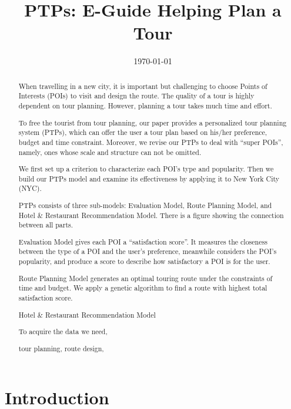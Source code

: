 \documentclass{mcmthesis}
\begin{document}
\linespread{0.6}
\setlength{\parskip}{0.5\baselineskip}
\title{PTPs: E-Guide Helping Plan a Tour}%

\date{\today}
\begin{abstract}
    When travelling in a new city, it is important but challenging to choose Points of Interests (POIs) to visit and design the route. The quality of a tour is highly dependent on tour planning. However, planning a tour takes much time and effort. \par
  To free the tourist from tour planning, our paper provides a personalized tour planning system (PTPs), which can offer the user a tour plan based on his/her preference, budget and time constraint. Moreover, we revise our PTPs to deal with ``super POIs'', namely, ones whose scale and structure can not be omitted. \par
  We first set up a criterion to characterize each POI's type and popularity. Then we build our PTPs model and examine its effectiveness by applying it to New York City (NYC).\par
  PTPs consists of three sub-models: Evaluation Model, Route Planning Model, and Hotel \& Restaurant Recommendation Model. There is a figure showing the connection between all parts.\par
  Evaluation Model gives each POI a ``satisfaction score''. It measures the closeness between the type of a POI and the user's preference, meanwhile considers the POI's popularity, and produce a score to describe how satisfactory a POI is for the user.\par
  Route Planning Model generates an optimal touring route under the constraints of time and budget. We apply a genetic algorithm to find a route with highest total satisfaction score. \par
  Hotel \& Restaurant Recommendation Model 

  To acquire the data we need, 
	\begin{keywords}
    tour planning, route design, 
	\end{keywords}
\end{abstract}

\maketitle
\tableofcontents

\newpage

\section{Introduction}	
\end{document}

